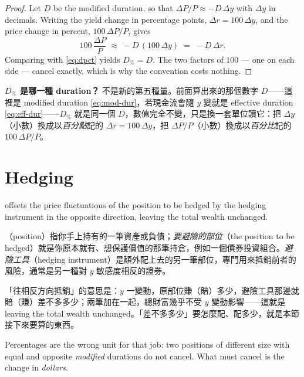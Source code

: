 \suppstart
\begin{proof}
	Let $D$ be the modified duration, so that $\Delta P/P \approx -D\,\Delta y$ with $\Delta y$ in decimals.
	Writing the yield change in percentage points, $\Delta r = 100\,\Delta y$, and the price change in percent, $100\,\Delta P/P$, gives
	\[
		100\,\frac{\Delta P}{P} \;\approx\; -D\,(100\,\Delta y) \;=\; -D\,\Delta r .
	\]
	Comparing with \eqref{eq:dpct} yields $D_{\%}=D$.
	The two factors of $100$ --- one on each side --- cancel exactly, which is why the convention costs nothing.
\end{proof}

\begin{remark}
	\textbf{$D_{\%}$ 是哪一種 duration？} 不是新的第五種量。前面算出來的那個數字 $D$——這裡是 modified duration \eqref{eq:mod-dur}，若現金流會隨 $y$ 變就是 effective duration \eqref{eq:eff-dur}——$D_{\%}$ 就是同一個 $D$，數值完全不變，只是換一套單位讀它：把 $\Delta y$（小數）換成以\emph{百分點}記的 $\Delta r=100\,\Delta y$，把 $\Delta P/P$（小數）換成以\emph{百分比}記的 $100\,\Delta P/P$。
\end{remark}
\suppend

\section{Hedging}


 offsets the price fluctuations of the position to be hedged by the hedging instrument in the opposite direction, leaving the total wealth unchanged.

\suppstart
\begin{remark}
	（position）指你手上持有的一筆資產或負債；\emph{要避險的部位}（the position to be hedged）就是你原本就有、想保護價值的那筆持倉，例如一個債券投資組合。\emph{避險工具}（hedging instrument）是額外配上去的另一筆部位，專門用來抵銷前者的風險，通常是另一種對 $y$ 敏感度相反的證券。

	「往相反方向抵銷」的意思是：$y$ 一變動，原部位賺（賠）多少，避險工具那邊就賠（賺）差不多多少；兩筆加在一起，總財富幾乎不受 $y$ 變動影響——這就是 leaving the total wealth unchanged。「差不多多少」要怎麼配、配多少，就是本節接下來要算的東西。
\end{remark}

Percentages are the wrong unit for that job: two positions of different size with equal and opposite \emph{modified} durations do not cancel.
What must cancel is the change in \emph{dollars}.
\suppend

